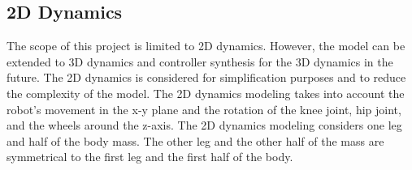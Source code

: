 \subsection{2D Dynamics}
The scope of this project is limited to 2D dynamics.
However, the model can be extended to 3D dynamics and controller synthesis for the 3D dynamics in the future.
The 2D dynamics is considered for simplification purposes and to reduce the complexity of the model.
The 2D dynamics modeling takes into account the robot's movement in the x-y plane and the rotation of the knee joint, hip joint, and the wheels around the z-axis.
The 2D dynamics modeling considers one leg and half of the body mass.
The other leg and the other half of the mass are symmetrical to the first leg and the first half of the body.





\newpage
